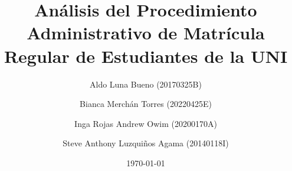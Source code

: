 \title{Análisis del Procedimiento Administrativo de Matrícula Regular de Estudiantes de la UNI}
\author{
Aldo Luna Bueno (20170325B) \and
Bianca Merchán Torres (20220425E) \and
Inga Rojas Andrew Owim (20200170A) \and
Steve Anthony Luzquiños Agama (20140118I)
}
\date{\today}